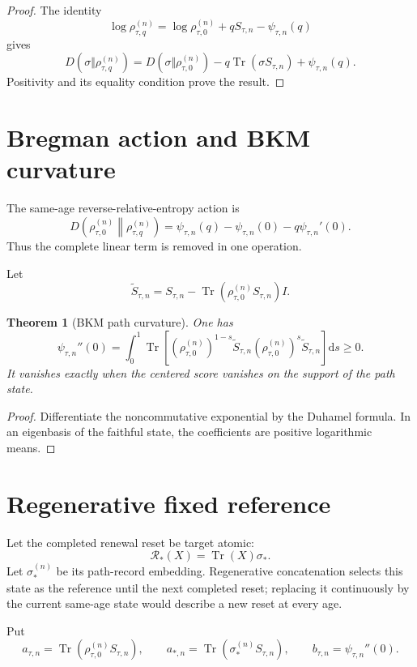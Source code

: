 \documentclass[11pt,oneside,openany]{book}
\numberwithin{equation}{chapter}
\newtheorem{theorem}{Theorem}[chapter]
\theoremstyle{definition}
\theoremstyle{remark}
\newcommand{\Tr}{\operatorname{Tr}}
\newcommand{\dd}{\mathrm d}
\begin{document}
\begin{proof}
The identity
\[
 \log\rho_{\tau,q}^{(n)}
 =
 \log\rho_{\tau,0}^{(n)}
 +
 qS_{\tau,n}
 -
 \psi_{\tau,n}(q)
\]
gives
\[
 D(\sigma\Vert\rho_{\tau,q}^{(n)})
 =
 D(\sigma\Vert\rho_{\tau,0}^{(n)})
 -
 q\Tr(\sigma S_{\tau,n})
 +
 \psi_{\tau,n}(q).
\]
Positivity and its equality condition prove the result.
\end{proof}

\section{Bregman action and BKM curvature}

The same-age reverse-relative-entropy action is
\[
 \boxed{
 D\!\left(
 \rho_{\tau,0}^{(n)}
 \middle\|
 \rho_{\tau,q}^{(n)}
 \right)
 =
 \psi_{\tau,n}(q)
 -
 \psi_{\tau,n}(0)
 -
 q\psi_{\tau,n}'(0).}
\]
Thus the complete linear term is removed in one operation.

Let
\[
 \widetilde S_{\tau,n}
 =
 S_{\tau,n}
 -
 \Tr(\rho_{\tau,0}^{(n)}S_{\tau,n})I.
\]

\begin{theorem}[BKM path curvature]
\label{thm:bkm-hessian}
One has
\[
 \boxed{
 \psi_{\tau,n}''(0)
 =
 \int_0^1
 \Tr\!\left[
 (\rho_{\tau,0}^{(n)})^{1-s}
 \widetilde S_{\tau,n}
 (\rho_{\tau,0}^{(n)})^s
 \widetilde S_{\tau,n}
 \right]\dd s
 \ge0.}
\]
It vanishes exactly when the centered score vanishes on the support of the
path state.
\end{theorem}

\begin{proof}
Differentiate the noncommutative exponential by the Duhamel formula.  In an
eigenbasis of the faithful state, the coefficients are positive logarithmic
means.
\end{proof}

\section{Regenerative fixed reference}

Let the completed renewal reset be target atomic:
\[
 \mathcal R_*(X)=\Tr(X)\sigma_*.
\]
Let \(\sigma_*^{(n)}\) be its path-record embedding.  Regenerative
concatenation selects this state as the reference until the next completed
reset; replacing it continuously by the current same-age state would describe
a new reset at every age.

Put
\[
 a_{\tau,n}
 =
 \Tr(\rho_{\tau,0}^{(n)}S_{\tau,n}),
 \qquad
 a_{*,n}
 =
 \Tr(\sigma_*^{(n)}S_{\tau,n}),
 \qquad
 b_{\tau,n}
 =
 \psi_{\tau,n}''(0).
\]
\end{document}
